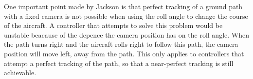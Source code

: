 One important point made by Jackson is that perfect tracking of a ground path with a fixed camera is not possible when using the roll angle to change the course of the aircraft. A controller that attempts to solve this problem would be unstable beacause of the depence the camera position has on the roll angle. When the path turns right and the aircraft rolls right to follow this path, the camera position will move left, away from the path. This only applies to controllers that attempt a perfect tracking of the path, so that a near-perfect tracking is still achievable.